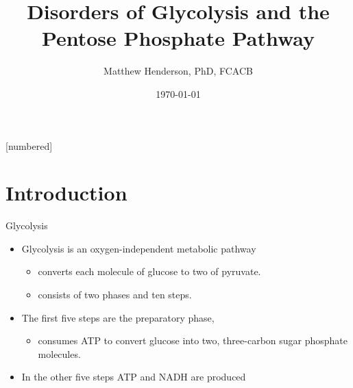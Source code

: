 \documentclass[presentation, smaller]{beamer}
\author{Matthew Henderson, PhD, FCACB}
\date{\today}
\title{Disorders of Glycolysis and the Pentose Phosphate Pathway}
\institute[NSO]{Newborn Screening Ontario | The University of Ottawa}
\begin{document}
\maketitle


\vspace{220pt}
\beamertemplatenavigationsymbolsempty
{}[numbered]

\section{Introduction}
\label{sec:org91062aa}
\begin{frame}[label={sec:org2781182}]{Glycolysis}
\begin{itemize}
\item Glycolysis is an oxygen-independent metabolic pathway
\begin{itemize}
\item converts each molecule of glucose to two of pyruvate.
\item consists of two phases and ten steps.
\end{itemize}
\item The first five steps are the preparatory phase,
\begin{itemize}
\item consumes ATP to convert glucose into two, three-carbon sugar
phosphate molecules.
\end{itemize}
\item In the other five steps ATP and NADH are produced
\end{itemize}
\end{frame}
\end{document}
